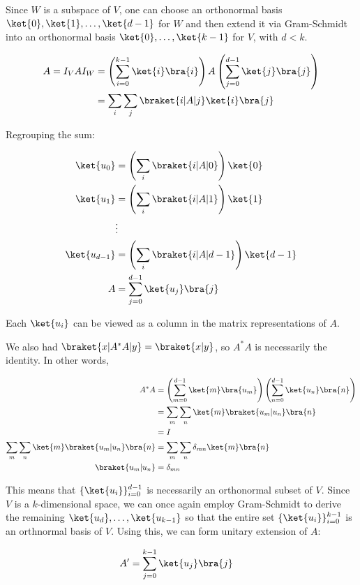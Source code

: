 \par Since $W$ is a subspace of $V$, one can choose an orthonormal basis
$\ket{0}, \ket{1}, \ldots, \ket{d-1}$ for $W$ and then extend it via
Gram-Schmidt into an orthonormal basis $\ket{0}, \ldots, \ket{k-1}$ for $V$,
with $d < k$.

\begin{align}
A = I_V A I_W &= \left( \sum_{i = 0}^{k - 1}{\ket{i} \bra{i}} \right) A \left(
\sum_{j = 0}^{d - 1}{\ket{j} \bra{j}} \right) \\
&= \sum_i{\sum_j{\braket{i|A|j} \ket{i} \bra{j}}}
\end{align}

Regrouping the sum:

\begin{align*}
\ket{u_0} &= \left( \sum_i{\braket{i|A|0}} \right) \ket{0} \\
\ket{u_1} &= \left( \sum_i{\braket{i|A|1}} \right) \ket{1} \\
&\vdots \\
\ket{u_{d-1}} &= \left( \sum_i{\braket{i|A|d-1}} \right) \ket{d-1} \\
A &= \sum_{j = 0}^{d - 1}{\ket{u_j} \bra{j}}
\end{align*}

Each $\ket{u_i}$ can be viewed as a column in the matrix representations of $A$.

\par We also had $\braket{x|A^* A|y} = \braket{x|y}$, so $A^* A$ is necessarily
the identity. In other words,

\begin{align}
A^* A &= \left( \sum_{m = 0}^{d - 1}{\ket{m} \bra{u_m}} \right) \left(
\sum_{n = 0}^{d - 1}{\ket{u_n} \bra{n}} \right) \\
&= \sum_m{\sum_n{\ket{m} \braket{u_m|u_n} \bra{n}}} \\
&= I \\
\sum_m{\sum_n{\ket{m} \braket{u_m|u_n} \bra{n}}} &= \sum_m{\sum_n{\delta_{mn}
\ket{m} \bra{n}}} \\
\braket{u_m|u_n} &= \delta_{mn}
\end{align}

This means that $\{\ket{u_i}\}_{i = 0}^{d - 1}$ is necessarily an orthonormal
subset of $V$. Since $V$ is a $k$-dimensional space, we can once again employ
Gram-Schmidt to derive the remaining $\ket{u_d}, \ldots, \ket{u_{k-1}}$ so that
the entire set $\{\ket{u_i}\}_{i = 0}^{k - 1}$ is an orthnormal basis of $V$.
Using this, we can form unitary extension of $A$:

\begin{align}
A' &= \sum_{j = 0}^{k - 1}{\ket{u_j} \bra{j}}
\end{align}
